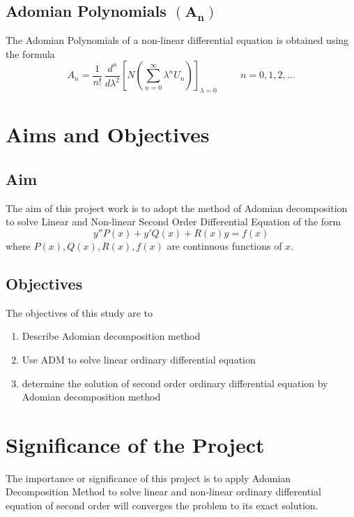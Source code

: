 \documentclass[11pt]{report}
\newcommand{\sprime}{'}
\newcommand{\dprime}{''}
\begin{document}
	\subsection{Adomian Polynomials $\mathbf{(A_n)}$}
	The Adomian Polynomials of a non-linear differential equation is obtained using the formula
	\begin{equation}
		A_n = \frac{1}{n!}~\frac{d^n}{d\lambda^2}\left[ N\left(\sum_{n=0}^{\infty}\lambda^n U_n\right)\right]_{\lambda=0}\hspace{1cm} n=0,1,2,\ldots
	\end{equation}

	\section{Aims and Objectives}
	\subsection{Aim}
	The aim of this project work is to adopt the method of Adomian decomposition to solve Linear and Non-linear Second Order Differential Equation of the form 
	\begin{equation*}
		y\dprime P(x) + y\sprime Q(x) + R(x)y = f(x)
	\end{equation*}
	where $P(x), Q(x), R(x),f(x)$ are continuous functions of $x$.
	
	\subsection{Objectives}
	The objectives of this study are to 
	\begin{enumerate}
		\item Describe Adomian decomposition method
		\item Use ADM to solve linear ordinary differential equation
		\item determine the solution of second order ordinary differential equation by Adomian decomposition method
	\end{enumerate}
	
	\section{Significance of the Project}
	The importance or significance of this project is to apply Adomian Decomposition Method to solve linear and non-linear ordinary differential equation of second order will converges the problem to its exact solution.
	
\end{document}

